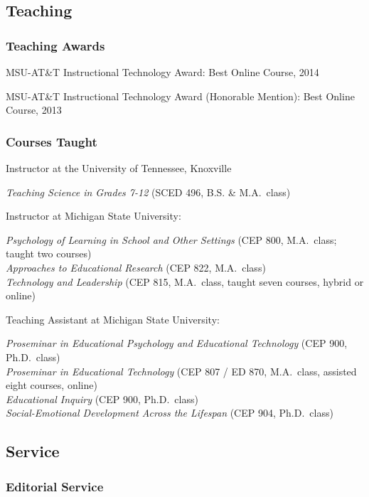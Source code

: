 \documentclass[]{article}
\begin{document}
\hypertarget{teaching}{%
\subsection{Teaching}\label{teaching}}

\hypertarget{teaching-awards}{%
\subsubsection{Teaching Awards}\label{teaching-awards}}

MSU-AT\&T Instructional Technology Award: Best Online Course, 2014

MSU-AT\&T Instructional Technology Award (Honorable Mention): Best
Online Course, 2013

\hypertarget{courses-taught}{%
\subsubsection{Courses Taught}\label{courses-taught}}

Instructor at the University of Tennessee, Knoxville

\emph{Teaching Science in Grades 7-12} (SCED 496, B.S. \& M.A.~class)

Instructor at Michigan State University:

\emph{Psychology of Learning in School and Other Settings} (CEP 800,
M.A.~class; taught two courses)\\
\emph{Approaches to Educational Research} (CEP 822, M.A.~class)\\
\emph{Technology and Leadership} (CEP 815, M.A.~class, taught seven
courses, hybrid or online)

Teaching Assistant at Michigan State University:

\emph{Proseminar in Educational Psychology and Educational Technology}
(CEP 900, Ph.D.~class)\\
\emph{Proseminar in Educational Technology} (CEP 807 / ED 870,
M.A.~class, assisted eight courses, online)\\
\emph{Educational Inquiry} (CEP 900, Ph.D.~class)\\
\emph{Social-Emotional Development Across the Lifespan} (CEP 904,
Ph.D.~class)

\hypertarget{service}{%
\subsection{Service}\label{service}}

\hypertarget{editorial-service}{%
\subsubsection{Editorial Service}\label{editorial-service}}
\end{document}
